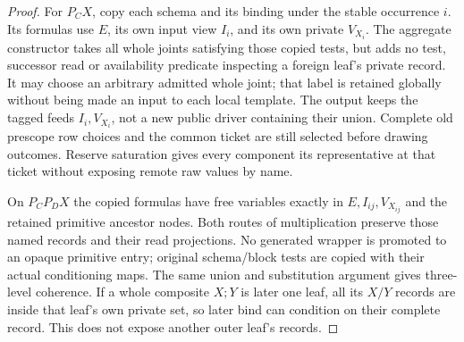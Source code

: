 \documentclass[11pt]{article}
\begin{document}
\begin{proof}
For $P_CX$, copy each schema and its binding under the stable occurrence $i$. Its formulas use $E$, its own input view $I_i$, and its own private $V_{X_i}$. The aggregate constructor takes all whole joints satisfying those copied tests, but adds no test, successor read or availability predicate inspecting a foreign leaf's private record. It may choose an arbitrary admitted whole joint; that label is retained globally without being made an input to each local template. The output keeps the tagged feeds $I_i,V_{X_i}$, not a new public driver containing their union. Complete old prescope row choices and the common ticket are still selected before drawing outcomes. Reserve saturation gives every component its representative at that ticket without exposing remote raw values by name.

On $P_CP_DX$ the copied formulas have free variables exactly in $E,I_{ij},V_{X_{ij}}$ and the retained primitive ancestor nodes. Both routes of multiplication preserve those named records and their read projections. No generated wrapper is promoted to an opaque primitive entry; original schema/block tests are copied with their actual conditioning maps. The same union and substitution argument gives three-level coherence. If a whole composite $X;Y$ is later one leaf, all its $X/Y$ records are inside that leaf's own private set, so later bind can condition on their complete record. This does not expose another outer leaf's records.\end{proof}
\end{document}
